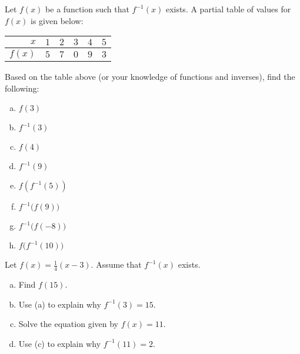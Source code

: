 \documentclass[11pt,letterpaper]{article}
\begin{document}

 Let $f(x)$ be a function such that $f^{-1}(x)$ exists. A partial table of values for $f(x)$ is given below: \par
	\begin{table}[!ht]
	\centering
	\begin{tabular}{|r||c|c|c|c|c|} \hline 
	$x$ & $1$ & $2$ & $3$ & $4$ & $5$ \\ \hline
	$f(x)$ & $5$ & $7$ & $0$ & $9$ & $3$ \\ \hline
	\end{tabular}
	\end{table}
Based on the table above (or your knowledge of functions and inverses), find the following:
	\begin{enumerate}[(a)]
	\item $f(3)$
	\item $f^{-1}(3)$
	\item $f(4)$
	\item $f^{-1}(9)$
	\item $f(f^{-1}(5))$
	\item $f^{-1} \big( f(9) \big)$
	\item $f^{-1} \big( f(-8) \big)$
	\item $f \big( f^{-1}(10) \big)$
	\end{enumerate}



\newpage



 Let $f(x)= \frac{1}{4} (x - 3)$. Assume that $f^{-1}(x)$ exists. 
	\begin{enumerate}[(a)]
	\item Find $f(15)$. 
	\item Use (a) to explain why $f^{-1}(3)= 15$. 
	\item Solve the equation given by $f(x)= 11$.
	\item Use (c) to explain why $f^{-1}(11)= 2$. 
	\end{enumerate}



\newpage
\end{document}
